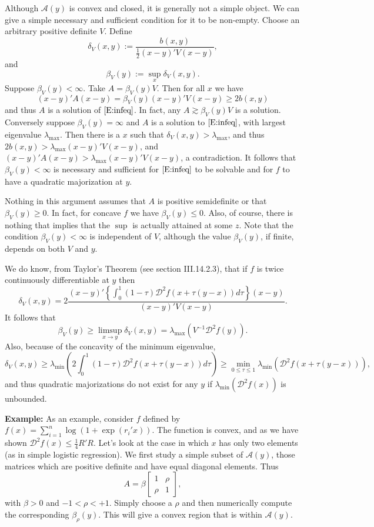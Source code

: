 \documentclass[
  12pt,
]{book}
\begin{document}
Although \(\mathcal{A}(y)\) is convex and closed, it is generally not a simple object. We can give a simple necessary and sufficient condition for it to be non-empty. Choose an arbitrary positive definite \(V\).
Define
\[
\delta_V(x,y):=\frac{b(x,y)}{\frac12(x-y)'V(x-y)},
\]
and
\[
\beta_V(y):=\sup_x\delta_V(x,y).
\]
Suppose \(\beta_V(y)<\infty\). Take \(A=\beta_V(y)V\). Then for all \(x\) we have
\[
(x-y)'A(x-y)=\beta_V(y)(x-y)'V(x-y)\geq 2b(x,y)
\]
and thus \(A\) is a solution of \(\eqref{E:infeq}\). In fact, any \(A\gtrsim\beta_V(y)V\) is a solution. Conversely suppose \(\beta_V(y)=\infty\) and \(A\) is a solution to \(\eqref{E:infeq}\), with largest eigenvalue \(\lambda_{\text{max}}\). Then there is a \(x\) such that \(\delta_V(x,y)>\lambda_{\text{max}}\), and thus \(2b(x,y)>\lambda_{\text{max}}(x-y)'V(x-y)\), and \((x-y)'A(x-y)>\lambda_{\text{max}} (x-y)'V(x-y)\), a contradiction. It follows that \(\beta_V(y)<\infty\) is necessary and sufficient for \(\eqref{E:infeq}\) to be solvable and for \(f\) to have a quadratic majorization at \(y\).

Nothing in this argument assumes that \(A\) is positive semidefinite or that \(\beta_V(y)\geq 0\). In fact, for concave \(f\) we have \(\beta_V(y)\leq 0\). Also, of course, there is nothing that implies that the \(\sup\) is actually attained at some \(z\). Note that the condition \(\beta_V(y)<\infty\) is independent of \(V\), although the value \(\beta_V(y)\), if finite, depends on both \(V\) and \(y.\)

We do know, from Taylor's Theorem (see section III.14.2.3), that if \(f\) is twice continuously differentiable at \(y\) then
\[
\delta_V(x,y)=2\frac{(x-y)'\left\{\int_0^1(1-\tau)\mathcal{D}^2f(x+\tau(y-x))d\tau\right\}(x-y)}{(x-y)'V(x-y)}.
\]
It follows that
\[
\beta_V(y)\geq\limsup_{x\rightarrow y}\delta_V(x,y)=\lambda_{\text{max}}(V^{-1}\mathcal{D}^2f(y)).
\]
Also, because of the concavity of the minimum eigenvalue,
\[
\delta_V(x,y)\geq\lambda_{\text{min}}\left(2\int_0^1(1-\tau)\mathcal{D}^2f(x+\tau(y-x))d\tau\right)\geq\min_{0\leq\tau\leq 1}\lambda_{\text{min}}\left(\mathcal{D}^2f(x+\tau(y-x))\right),
\]
and thus quadratic majorizations do not exist for any \(y\) if \(\lambda_{\text{min}}\left(\mathcal{D}^2f(x)\right)\) is unbounded.

\textbf{Example:} As an example, consider \(f\) defined by \(f(x)=\sum_{i=1}^n\log(1+\exp(r_i'x)).\)
The function is convex, and as we have shown \(\mathcal{D}^2f(x)\leq\frac14 R'R.\) Let's look at the case in which \(x\) has only two elements (as in simple logistic regression). We first study a simple subset of \(\mathcal{A}(y)\), those matrices which are positive definite and have equal diagonal elements. Thus
\[
A=\beta\begin{bmatrix}1&\rho\\\rho&1\end{bmatrix},
\]
with \(\beta>0\) and \(-1<\rho<+1.\) Simply choose a \(\rho\) and then numerically compute the corresponding \(\beta_\rho(y).\) This will give
a convex region that is within \(\mathcal{A}(y).\)
\end{document}
